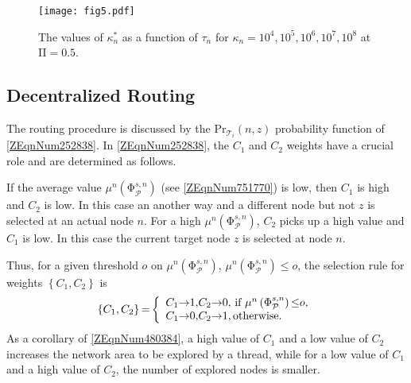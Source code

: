 \documentclass[11pt]{article}%
\begin{document}
\begin{figure*}[h!]
\vspace{-0.6cm}
 \begin{center}
 	 \texttt{[image: fig5.pdf]}

\caption{The values of ${\kappa }^{\mathrm{*}}_n$ as a function of ${\tau }_n$ for ${\kappa }_n\mathrm{=1}0^{\mathrm{4}}\mathrm{,1}0^{\mathrm{5}}\mathrm{,1}0^{\mathrm{6}}\mathrm{,1}0^{\mathrm{7}}\mathrm{,1}0^{\mathrm{8}}$ at $\mathrm{\Pi }\mathrm{=0.5}$.}
\label{fig5}
\end{center}
\end{figure*}
 
\subsection{Decentralized Routing}

 The routing procedure is discussed by the $\mathrm{P}{\mathrm{r}}_{{\mathcal{T}}_i}\left(n,z\right)$ probability function of \eqref{ZEqnNum252838}. In \eqref{ZEqnNum252838}, the  $C_{\mathrm{1}}$ and $C_{\mathrm{2}}$ weights have a crucial role and are determined as follows. 

 If the average value ${\mu }^n\left({\mathrm{\Phi }}^{s,n}_{\mathcal{P}}\right)$ (see \eqref{ZEqnNum751770}) is low, then $C_{\mathrm{1}}$ is high and $C_{\mathrm{2}}$ is low. In this case an another way and a different node but not $z$ is selected at an actual node $n$. For a high ${\mu }^n\left({\mathrm{\Phi }}^{s,n}_{\mathcal{P}}\right)$, $C_{\mathrm{2}}$ picks up a high value and $C_{\mathrm{1}}$ is low. In this case the current target node $z$ is selected at node $n$. 

Thus, for a given threshold $o$ on ${\mu }^n\left({\mathrm{\Phi }}^{s,n}_{\mathcal{P}}\right)$, ${\mu }^n\left({\mathrm{\Phi }}^{s,n}_{\mathcal{P}}\right)\mathrm{\le }o$, the selection rule for weights $\left\{C_{\mathrm{1}},C_{\mathrm{2}}\right\}$ is 
\begin{equation} \label{ZEqnNum480384} 
\left\{C_{\mathrm{1}},C_{\mathrm{2}}\right\}\mathrm{=}\left\{ \begin{array}{l}
C_{\mathrm{1}}\mathrm{\to }\mathrm{1,}C_{\mathrm{2}}\mathrm{\to }\mathrm{0,}\textnormal{ if }{\mu }^n\left({\mathrm{\Phi }}^{s,n}_{\mathcal{P}}\right)\mathrm{\le }o, \\ 
C_{\mathrm{1}}\mathrm{\to }\mathrm{0,}C_{\mathrm{2}}\mathrm{\to }\mathrm{1,otherwise.} \end{array}
\right. 
\end{equation} 
As a corollary of \eqref{ZEqnNum480384}, a high value of $C_{\mathrm{1}}$ and a low value of $C_{\mathrm{2}}$ increases the network area to be explored by a thread, while for a low value of $C_{\mathrm{1}}$ and a high value of $C_{\mathrm{2}}$, the number of explored nodes is smaller. 
\end{document}
